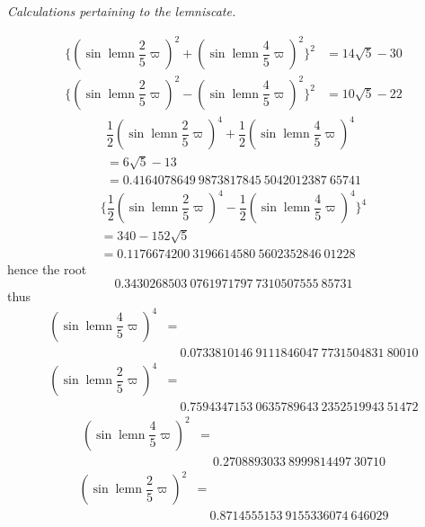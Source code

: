 \begin{center}\textit{Calculations pertaining to the lemniscate.}\end{center}
\[
\begin{aligned}
\{(\sin\operatorname{lemn}\dfrac25\varpi)^2
+(\sin\operatorname{lemn}\dfrac45\varpi)^2\}^2&=14\surd5-30\\[5pt]
\{(\sin\operatorname{lemn}\dfrac25\varpi)^2
-(\sin\operatorname{lemn}\dfrac45\varpi)^2\}^2&=10\surd5-22
\end{aligned}
\]
\[
\begin{gathered}
\dfrac12(\sin\operatorname{lemn}\dfrac25\varpi)^4
+\dfrac12(\sin\operatorname{lemn}\dfrac45\varpi)^4
\\[5pt]=6\surd5-13\\[5pt]
=0.4164078649\ 9873817845\ 5042012387\ 65741
\end{gathered}
\]
\[
\begin{gathered}
\{\dfrac12(\sin\operatorname{lemn}\dfrac25\varpi)^4
-\dfrac12(\sin\operatorname{lemn}\dfrac45\varpi)^4\}^4
\\[5pt]=340-152\surd5\\[5pt]
=0.1176674200\ 3196614580\ 5602352846\ 01228
\end{gathered}
\]
\noindent hence the root
\[
0.3430268503\ 0761971797\ 7310507555\ 85731
\]
\noindent thus
\[
\begin{aligned}(\sin\operatorname{lemn}\dfrac45\varpi)^4
&=\\[5pt]&\quad{}0.0733810146\ 9111846047\ 7731504831\ 80010\end{aligned}
\]
\[
\begin{aligned}(\sin\operatorname{lemn}\dfrac25\varpi)^4
&=\\[5pt]&\quad{}0.7594347153\ 0635789643\ 2352519943\ 51472\end{aligned}
\]
\[
\begin{aligned}(\sin\operatorname{lemn}\dfrac45\varpi)^2
&=\\[5pt]&\quad{}0.2708893033\ 8999814497\ 30710\end{aligned}
\]
\[
\begin{aligned}(\sin\operatorname{lemn}\dfrac25\varpi)^2
&=\\[5pt]&\quad{}0.8714555153\ 9155336074\ 646029\end{aligned}
\]
